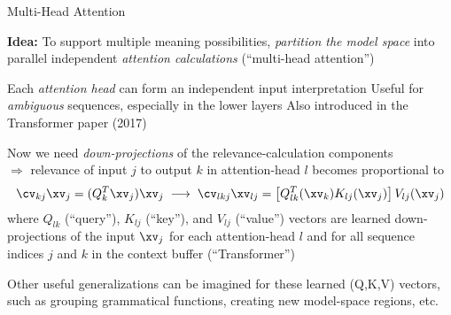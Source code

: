 




\begin{slide}[\slideopts]{Multi-Head Attention}

\textbf{Idea:} To support multiple meaning possibilities, \emph{partition the model space} into\\
parallel independent \emph{attention calculations} (``multi-head attention'')


\begin{itemize}
  \mpitem Each \emph{attention head} can form an independent input interpretation
  \mpitem Useful for \emph{ambiguous} sequences, especially in the lower layers
  \mpitem Also introduced in the Transformer paper (2017)
\end{itemize}

\maybepause

Now we need \emph{down-projections} of the relevance-calculation components\\
$\Rightarrow$ relevance of input $j$ to output $k$ in attention-head $l$ becomes proportional to
\[
\cv_{kj}\xv_j = (Q_k^T \xv_j)\xv_j \;\longrightarrow\; \cv_{lkj}\xv_{lj} = \left[Q_{lk}^T(\xv_k) K_{lj}(\xv_{j})\right]V_{lj}(\xv_j)
\]
where $Q_{lk}$ (``query''), $K_{lj}$ (``key''), and $V_{lj}$
(``value'') vectors are learned down-projections of the input $\xv_j$
for each attention-head $l$ and for all sequence indices $j$ and $k$
in the context buffer (``Transformer'')


\maybepause

Other useful generalizations can be imagined for these learned (Q,K,V)
vectors, such as grouping grammatical functions, creating new
model-space regions, etc.

\end{slide}

